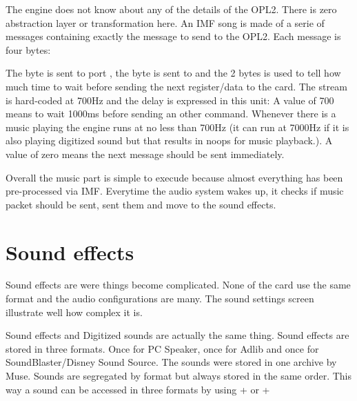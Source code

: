 \par
The engine does not know about any of the details of the OPL2. There is zero abstraction layer or transformation here. An IMF song is made of a serie of messages containing exactly the message to send to the OPL2. Each message is four bytes:\\
\par
\begin{minipage}{\textwidth}

\end{minipage}
\par
The  byte is sent to port , the  byte is sent to  and the  2 bytes is used to tell how much time to wait before sending the next register/data to the card. The stream is hard-coded at 700Hz and the delay is expressed in this unit: A value of 700 means to wait 1000ms before sending an other command. Whenever there is a music playing the engine runs at no less than 700Hz (it can run at 7000Hz if it is also playing digitized sound but that results in noops for music playback.). A value of zero means the next message should be sent immediately.\\
\par
Overall the music part is simple to execude because almost everything has been pre-processed via IMF. Everytime the audio system wakes up, it checks if music packet should be sent, sent them and move to the sound effects.










\section{Sound effects}
Sound effects are were things become complicated. None of the card use the same format and
the audio configurations are many. The sound settings screen illustrate well how complex it is.
\par
\begin{figure}[H]
\centering
 \end{figure}
\par
Sound effects and Digitized sounds are actually the same thing. Sound effects are stored in three formats. Once for PC Speaker, once for Adlib and once for SoundBlaster/Disney Sound Source. The sounds were stored in one  archive by Muse. Sounds are segregated by format but always stored in the same order. This way a sound can be accessed in three formats by using  +  or  + \\

